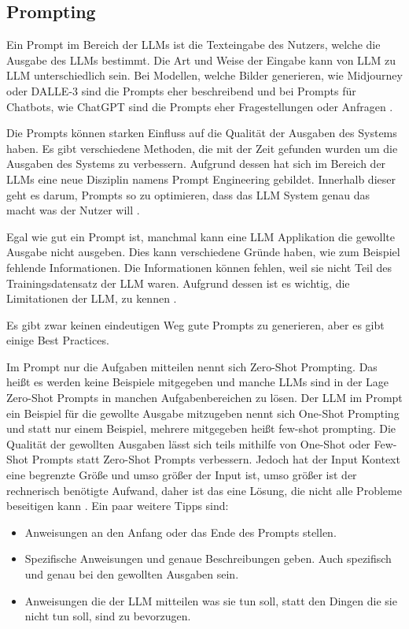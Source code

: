 \subsection{Prompting}
\label{s:intro:llm:prom}
Ein Prompt im Bereich der LLMs ist die Texteingabe des Nutzers, welche die Ausgabe des LLMs bestimmt. 
Die Art und Weise der Eingabe kann von LLM zu LLM unterschiedlich sein. Bei Modellen, welche 
Bilder generieren, wie Midjourney oder DALLE-3 sind die Prompts eher beschreibend und bei 
Prompts für Chatbots, wie ChatGPT sind die Prompts eher Fragestellungen oder Anfragen \cite{amatriainPromptDesignEngineering2024}. \par
Die Prompts können starken Einfluss auf die Qualität der Ausgaben des Systems haben.
Es gibt verschiedene Methoden, die mit der Zeit gefunden wurden um die Ausgaben 
des Systems zu verbessern. 
Aufgrund dessen hat sich im Bereich der LLMs eine neue Disziplin namens Prompt Engineering 
gebildet. Innerhalb dieser geht es darum, Prompts so zu optimieren, dass das LLM System genau 
das macht was der Nutzer will \cite{amatriainPromptDesignEngineering2024}.\par
Egal wie gut ein Prompt ist, manchmal kann eine LLM Applikation die gewollte Ausgabe nicht
ausgeben. Dies kann verschiedene Gründe haben, wie zum Beispiel fehlende Informationen. Die 
Informationen können fehlen, weil sie nicht Teil des Trainingsdatensatz der LLM waren. 
Aufgrund dessen ist es wichtig, die Limitationen der
LLM, zu kennen \cite{amatriainPromptDesignEngineering2024}.\par \bigskip
Es gibt zwar keinen eindeutigen Weg gute Prompts zu generieren, aber es gibt einige
Best Practices. \par
Im Prompt nur die Aufgaben mitteilen nennt sich Zero-Shot Prompting.
Das heißt es werden keine Beispiele mitgegeben und manche LLMs 
sind in der Lage Zero-Shot Prompts in manchen Aufgabenbereichen zu lösen.
Der LLM im Prompt ein Beispiel für die gewollte Ausgabe mitzugeben
nennt sich One-Shot Prompting und statt nur einem Beispiel, mehrere mitgegeben 
heißt few-shot prompting. Die Qualität der gewollten Ausgaben lässt sich teils mithilfe
von One-Shot oder Few-Shot Prompts statt Zero-Shot Prompts verbessern.
Jedoch hat der Input Kontext eine begrenzte Größe und umso größer 
der Input ist, umso größer ist der rechnerisch benötigte Aufwand,
daher ist das eine Lösung, die nicht alle Probleme beseitigen kann \cite{amatriainPromptDesignEngineering2024}.
Ein paar weitere Tipps sind: 
\begin{itemize}
    \item Anweisungen an den Anfang oder das Ende des Prompts stellen.
    \item Spezifische Anweisungen und genaue Beschreibungen geben. Auch spezifisch und genau bei den gewollten Ausgaben sein.
    \item Anweisungen die der LLM mitteilen was sie tun soll, statt den Dingen die sie nicht tun soll, sind zu bevorzugen.
\end{itemize}
